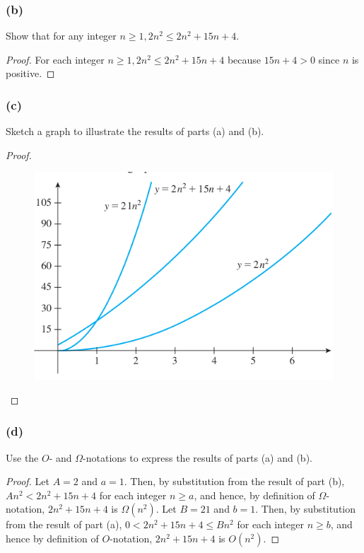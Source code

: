 \documentclass[14pt]{extarticle}
\begin{document}
\subsubsection{(b)}
Show that for any integer \(n \geq 1, 2n^2 \leq 2n^2 + 15n + 4\).

\begin{proof}
    For each integer \(n \geq 1, 2n^2 \leq 2n^2 + 15n + 4\) because \(15n + 4 > 0\) since \(n\) is positive.
\end{proof}

\subsubsection{(c)}
Sketch a graph to illustrate the results of parts (a) and (b).
\begin{proof}
    \begin{figure}[ht!]
        \centering
        \includegraphics[scale=0.5]{../images/11.2.10.c.png}
    \end{figure}
\end{proof}

\subsubsection{(d)}
Use the \(O\)- and \(\Omega\)-notations to express the results of parts (a) and (b).

\begin{proof}
    Let \(A = 2\) and \(a = 1\). Then, by substitution from the result of part (b), \(An^2 < 2n^2 + 15n + 4\) for each integer
    \(n \geq a\), and hence, by definition of \(\Omega\)-notation, \(2n^2 + 15n + 4\) is \(\Omega(n^2)\). Let \(B = 21\) and
    \(b = 1\). Then, by substitution from the result of part (a), \(0< 2n^2 + 15n + 4 \leq Bn^2\) for each integer \(n \geq b\),
    and hence by definition of \(O\)-notation, \(2n^2 + 15n + 4\) is \(O(n^2)\).
\end{proof}
\end{document}
